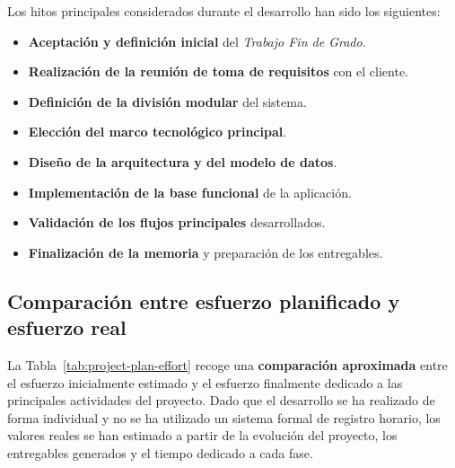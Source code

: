 Los hitos principales considerados durante el desarrollo han sido los siguientes:

\begin{itemize}
    \item \textbf{Aceptación y definición inicial} del \textit{Trabajo Fin de Grado}.
    \item \textbf{Realización de la reunión de toma de requisitos} con el cliente.
    \item \textbf{Definición de la división modular} del sistema.
    \item \textbf{Elección del marco tecnológico principal}.
    \item \textbf{Diseño de la arquitectura y del modelo de datos}.
    \item \textbf{Implementación de la base funcional} de la aplicación.
    \item \textbf{Validación de los flujos principales} desarrollados.
    \item \textbf{Finalización de la memoria} y preparación de los entregables.
\end{itemize}

\subsection{Comparación entre esfuerzo planificado y esfuerzo real}

La Tabla~\ref{tab:project-plan-effort} recoge una \textbf{comparación aproximada} entre el esfuerzo inicialmente estimado y el esfuerzo finalmente dedicado a las principales actividades del proyecto. Dado que el desarrollo se ha realizado de forma individual y no se ha utilizado un sistema formal de registro horario, los valores reales se han estimado a partir de la evolución del proyecto, los entregables generados y el tiempo dedicado a cada fase.

